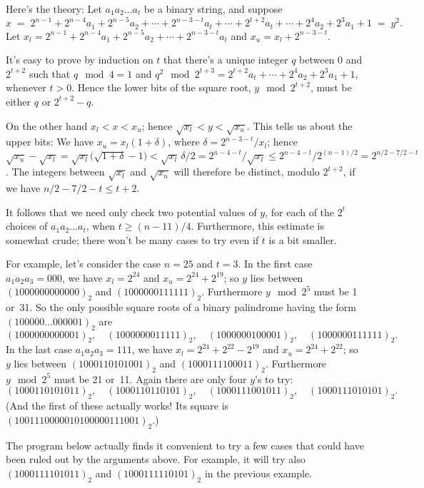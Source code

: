 Here's the theory: Let $a_1a_2\ldots a_t$ be a binary string, and suppose
$$x\;=\;2^{n-1}+2^{n-4}a_1+2^{n-5}a_2+\cdots+2^{n-3-t}a_t+\cdots+
2^{t+2}a_t+\cdots+2^4a_2+2^3a_1+1\;=\;y^2.$$
Let $x_l=2^{n-1}+2^{n-4}a_1+2^{n-5}a_2+\cdots+2^{n-3-t}a_t$ and
$x_u=x_l+2^{n-3-t}$.

It's easy to prove by induction on $t$ that
there's a unique integer $q$ between 0 and $2^{t+2}$ such that
$q\mod4=1$ and $q^2\mod2^{t+3}=2^{t+2}a_t+\cdots+2^4a_2+2^3a_1+1$,
whenever $t>0$.
Hence the lower bits of the square root, $y\mod 2^{t+2}$,
must be either $q$ or $2^{t+2}-q$.

On the other hand $x_l<x<x_u$; hence $\sqrt{x_l}<y<\sqrt{x_u}$.
This tells us about the upper bits: We have $x_u=x_l(1+\delta)$,
where $\delta=2^{n-3-t}\!/x_l$; hence $\sqrt{x_u}-\sqrt{x_l}
=\sqrt{x_l}\bigl(\sqrt{1+\delta}-1\bigr)
<\sqrt{x_l}\,\delta/2=2^{n-4-t}\!/\sqrt{x_l}
\le2^{n-4-t}\!/2^{(n-1)/2}=2^{n/2-7/2-t}$. The integers between
$\sqrt{x_l}$ and $\sqrt{x_u}$ will therefore be distinct, modulo $2^{t+2}$,
if we have $n/2-7/2-t\le t+2$.

It follows that we need only check two potential values of $y$, for each
of the $2^t$ choices of $a_1a_2\ldots a_t$, when $t\ge(n-11)/4$. Furthermore,
this estimate is somewhat crude; there won't be many cases to try even
if $t$ is a bit smaller.

For example, let's consider the case $n=25$ and $t=3$. In the first
case $a_1a_2a_3=000$, we have $x_l=2^{24}$ and $x_u=2^{24}+2^{19}$;
so $y$ lies between $(1000000000000)_2$ and $(1000000111111)_2$.
Furthermore $y\mod2^5$ must be 1 or~31. So the only possible
square roots of a binary palindrome having the form $(100000\ldots000001)_2$
are
$$(1000000000001)_2,\quad
(1000000011111)_2,\quad
(1000000100001)_2,\quad
(1000000111111)_2.$$
In the last case $a_1a_2a_3=111$, we have $x_l=2^{24}+2^{22}-2^{19}$
and $x_u=2^{24}+2^{22}$;
so $y$ lies between $(1000110101001)_2$ and $(1000111100011)_2$.
Furthermore $y\mod2^5$ must be 21 or~11. Again there are only
four $y$'s to try:
$$(1000110101011)_2,\quad
(1000110110101)_2,\quad
(1000111001011)_2,\quad
(1000111010101)_2.$$
(And the first of these actually works! Its square is
$(1001110000010100000111001)_2$.)

The program below actually finds it convenient to try a
few cases that could have been ruled out by the arguments above.
For example, it will try also
$(1000111101011)_2$ and
$(1000111110101)_2$ in the previous example.

\fi

